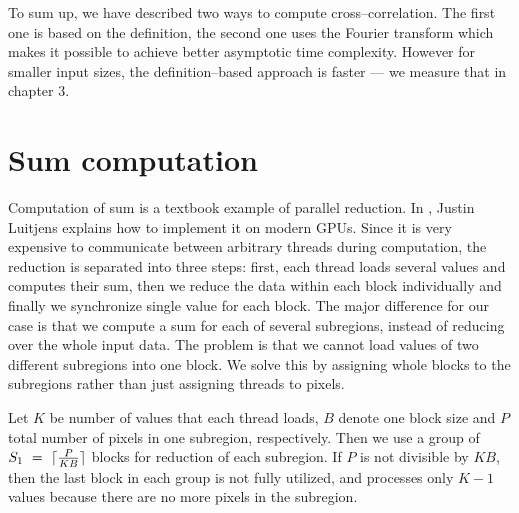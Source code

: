 \vspace{5px}

To sum up, we have described two ways to compute cross--correlation. The first one is based on the definition, the second one uses the Fourier transform which makes it possible to achieve better asymptotic time complexity. However for smaller input sizes, the definition--based approach is faster --- we measure that in chapter 3.


\section{Sum computation}
\label{sums}

Computation of sum is a textbook example of parallel reduction. In \cite{parallelReduction}, Justin Luitjens explains how to implement it on modern GPUs. Since it is very expensive to communicate between arbitrary threads during computation, the reduction is separated into three steps: first, each thread loads several values and computes their sum, then we reduce the data within each block individually and finally we synchronize single value for each block. The major difference for our case is that we compute a sum for each of several subregions, instead of reducing over the whole input data. The problem is that we cannot load values of two different subregions into one block. We solve this by assigning whole blocks to the subregions rather than just assigning threads to pixels.

Let $K$ be number of values that each thread loads, $B$ denote one block size and $P$ total number of pixels in one subregion, respectively. Then we use a group of $S_1~=~\lceil\frac{P}{KB}\rceil$ blocks for reduction of each subregion. If $P$ is not divisible by $KB$, then the last block in each group is not fully utilized, and processes only $K - 1$ values because there are no more pixels in the subregion.


